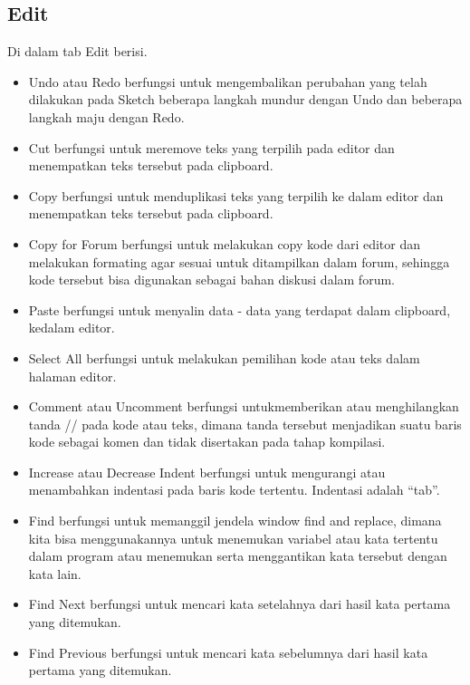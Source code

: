 \subsection{Edit}
Di dalam tab Edit berisi.
\begin{itemize}
\item Undo atau Redo berfungsi untuk mengembalikan perubahan yang telah dilakukan pada Sketch beberapa langkah mundur dengan Undo dan beberapa langkah maju dengan Redo.
\item Cut berfungsi untuk meremove teks yang terpilih pada editor dan menempatkan teks tersebut pada clipboard.
\item Copy berfungsi untuk menduplikasi teks yang terpilih ke dalam editor dan menempatkan teks tersebut pada clipboard.






\item Copy for Forum berfungsi untuk melakukan copy kode dari editor dan melakukan formating agar sesuai untuk ditampilkan dalam forum, sehingga kode tersebut bisa digunakan sebagai bahan diskusi dalam forum.
\item Paste berfungsi untuk menyalin data - data yang terdapat dalam clipboard, kedalam editor.
\item Select All berfungsi untuk melakukan pemilihan kode atau teks dalam halaman editor.
\item Comment atau Uncomment berfungsi untukmemberikan atau menghilangkan tanda // pada kode atau teks, dimana tanda tersebut menjadikan suatu baris kode sebagai komen dan tidak disertakan pada tahap kompilasi.
\item Increase atau Decrease Indent berfungsi untuk mengurangi atau menambahkan indentasi pada baris kode tertentu. Indentasi adalah “tab”.
\item Find berfungsi untuk memanggil jendela window find and replace, dimana kita bisa menggunakannya untuk menemukan variabel atau kata tertentu dalam program atau menemukan serta menggantikan kata tersebut dengan kata lain.
\item Find Next berfungsi untuk mencari kata setelahnya dari hasil kata pertama yang ditemukan.
\item Find Previous berfungsi untuk mencari kata sebelumnya dari hasil kata pertama yang ditemukan.
\end{itemize} 

